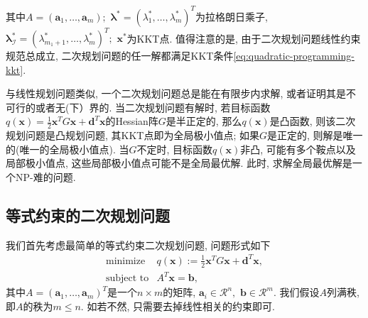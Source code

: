 \documentclass{SBCbookchapter}
\newcommand{\V}[1]{{\bm{#1}}}
\newcommand{\R}{\mathcal{R}}
\numberwithin{equation}{section}
\begin{document}
其中$A = (\V{a}_1, \ldots, \V{a}_m);$ $\V{\lambda}^* = (\lambda_1^*, \ldots, \lambda_m^*)^T$为拉格朗日乘子, $\V{\lambda}^*_{\mathcal{I}} = (\lambda_{m_1+1}^*, \ldots, \lambda_m^*)^T;$ $\V{x}^*$为KKT点. 值得注意的是, 由于二次规划问题线性约束规范总成立, 二次规划问题的任一解都满足KKT条件\eqref{eq:quadratic-programming-kkt}.

与线性规划问题类似, 一个二次规划问题总是能在有限步内求解, 或者证明其是不可行的或者无(下）界的. 当二次规划问题有解时, 若目标函数$q(\V{x}) = \frac{1}{2} \V{x}^T G \V{x} + \V{d}^T \V{x}$的Hessian阵$G$是半正定的, 那么$q(\V{x})$是凸函数, 则该二次规划问题是凸规划问题, 其KKT点即为全局极小值点; 如果$G$是正定的, 则解是唯一的(唯一的全局极小值点). 当$G$不定时, 目标函数$q(\V{x})$非凸, 可能有多个鞍点以及局部极小值点, 这些局部极小值点可能不是全局最优解. 此时, 求解全局最优解是一个NP-难的问题\cite{Murty_1987}.

\subsection{等式约束的二次规划问题}
\label{subsec:7.2.1}

我们首先考虑最简单的等式约束二次规划问题, 问题形式如下
\begin{equation}
\label{eq:quadratic-programming-eq-constrained}
\begin{array}{cl}
\text{minimize} & q(\V{x}) := \frac{1}{2} \V{x}^T G \V{x} + \V{d}^T \V{x}, \\
\text{subject to} & A^T \V{x} = \V{b},
\end{array}
\end{equation}
其中$A = (\V{a}_1, \ldots, \V{a}_m)^T$是一个$n \times m$的矩阵, $\V{a}_i \in \R^n,$ $\V{b} \in \R^m.$ 我们假设$A$列满秩, 即$A$的秩为$m \leqslant n.$ 如若不然, 只需要去掉线性相关的约束即可.
\end{document}
